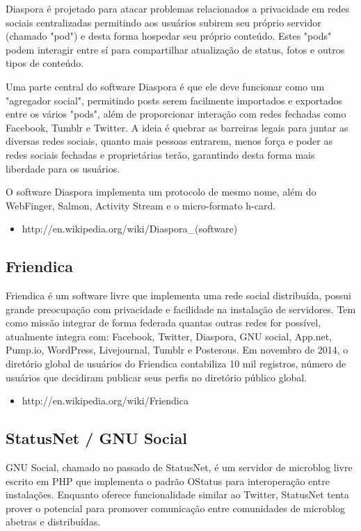 \documentclass[12pt]{article}
\begin{document}
Diaspora é projetado para atacar problemas relacionados a privacidade em redes
sociais centralizadas permitindo aos usuários subirem seu próprio servidor
(chamado "pod") e desta forma hospedar seu próprio conteúdo. Estes "pods" podem
interagir entre sí para compartilhar atualização de status, fotos e outros tipos de
conteúdo.

Uma parte central do software Diaspora é que ele deve funcionar como um
"agregador social", permitindo posts serem facilmente importados e exportados
entre os vários "pods", além de proporcionar interação com redes fechadas como
Facebook, Tumblr e Twitter. A ideia é quebrar as barreiras legais para juntar as
diversas redes sociais, quanto mais pessoas entrarem, menos força e poder as
redes sociais fechadas e proprietárias terão, garantindo desta forma mais
liberdade para os usuários.

O software Diaspora implementa um protocolo de mesmo nome, além do WebFinger,
Salmon, Activity Stream e o micro-formato h-card.

\begin{itemize}
  \item http://en.wikipedia.org/wiki/Diaspora\_(software)
\end{itemize}

\subsection{Friendica}

Friendica é um software livre que implementa uma rede social distribuída,
possui grande preocupação com privacidade e facilidade na instalação de
servidores. Tem como missão integrar de forma federada quantas outras
redes for possível, atualmente integra com: Facebook, Twitter, Diaspora, GNU
social, App.net, Pump.io, WordPress, Livejournal, Tumblr e Posterous. Em
novembro de 2014, o diretório global de usuários do Friendica contabiliza 10
mil registros, número de usuários que decidiram publicar seus perfis no
diretório público global.

\begin{itemize}
  \item http://en.wikipedia.org/wiki/Friendica
\end{itemize}

\subsection{StatusNet / GNU Social}

GNU Social, chamado no passado de StatusNet, é um servidor de microblog livre
escrito em PHP que implementa o padrão OStatus para interoperação entre
instalações. Enquanto oferece funcionalidade similar ao Twitter, StatusNet
tenta prover o potencial para promover comunicação entre comunidades de
microblog abetras e distribuídas.
\end{document}
